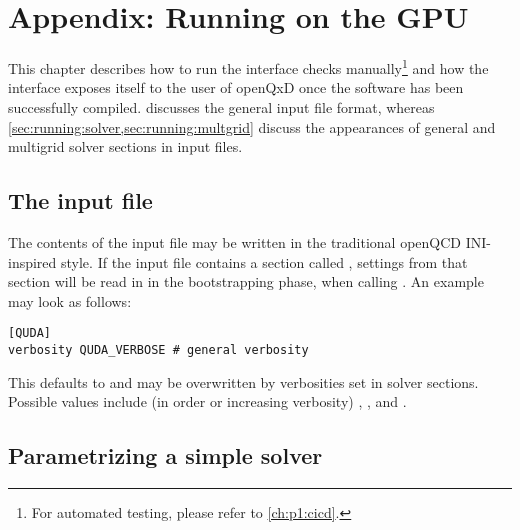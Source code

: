 \chapter{Appendix: Running on the GPU}
\label{ch:appendix:running}


This chapter describes how to run the interface checks manually\footnote{For automated testing, please refer to \cref{ch:p1:cicd}.} and how the interface exposes itself to the user of openQxD once the software has been successfully compiled.
 discusses the general input file format, whereas \cref{sec:running:solver,sec:running:multgrid} discuss the appearances of general and multigrid solver sections in input files.

\section{The input file}
\label{sec:running:infile}

The contents of the input file may be written in the traditional openQCD INI-inspired style.
If the input file contains a section called , settings from that section will be read in in the bootstrapping phase, \ie when calling .
An example may look as follows:
\begin{verbatim}
[QUDA]
verbosity QUDA_VERBOSE # general verbosity
\end{verbatim}
This defaults to  and may be overwritten by verbosities set in solver sections.
Possible values include (in order or increasing verbosity) , ,  and .

\section{Parametrizing a simple solver}
\label{sec:running:solver}


